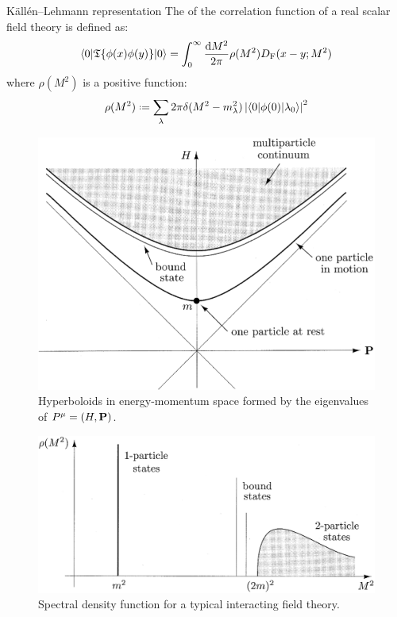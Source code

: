 \begin{definition}{Källén--Lehmann representation}{}
  The  of the correlation function of a real scalar field theory is defined as:
  \begin{equation}
    \braket{0 | \mathfrak{T}\{\phi(x) \phi(y)\} | 0} = \int_0^\infty \frac{\mathrm{d} M^2}{2\pi} \rho(M^2) D_\text{F}(x-y ; M^2)
  \end{equation}
  where $ \rho(M^2) $ is a positive  function:
  \begin{equation}
    \rho(M^2) \defeq \sum_\lambda 2\pi \delta(M^2 - m_\lambda^2) \abs{\braket{0 | \phi(0) | \lambda_0}}^2
  \end{equation}
\end{definition}

\begin{figure}[!ht]
  \centering
  \includegraphics[width = 0.70 \textwidth]{images/mas-hyp.png}
  \caption{Hyperboloids in energy-momentum space formed by the eigenvalues of $ P^\mu = (H, \mathbf{P}) $.}
  \label{fig:mass-1}
\end{figure}

\begin{figure}[!ht]
  \centering
  \includegraphics[width = 0.60 \textwidth]{images/spec-dens.png}
  \caption{Spectral density function for a typical interacting field theory.}
  \label{fig:mass-2}
\end{figure}

